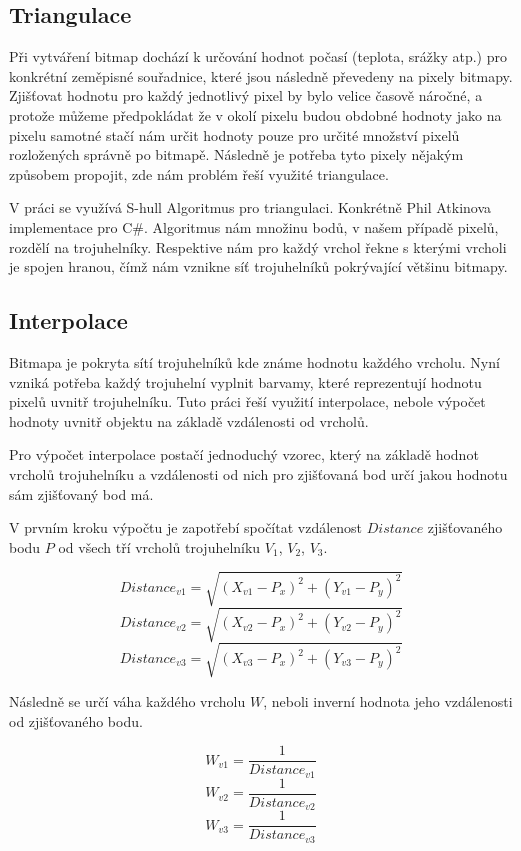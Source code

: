 \documentclass[czech,bachelor,dept460,male,csharp,cpdeclaration]{diploma}
\begin{document}
	\subsection{Triangulace}
	
	Při vytváření bitmap dochází k určování hodnot počasí (teplota, srážky atp.) pro konkrétní zeměpisné souřadnice, které jsou následně převedeny na pixely bitmapy. Zjišťovat hodnotu pro každý jednotlivý pixel by bylo velice časově náročné, a protože můžeme předpokládat že v okolí pixelu budou obdobné hodnoty jako na pixelu samotné stačí nám určit hodnoty pouze pro určité množství pixelů rozložených správně po bitmapě. Následně je potřeba tyto pixely nějakým způsobem propojit, zde nám problém řeší využité triangulace.
	
	V práci se využívá S-hull Algoritmus pro triangulaci. Konkrétně Phil Atkinova implementace pro C\#. Algoritmus nám množinu bodů, v našem případě pixelů, rozdělí na trojuhelníky. Respektive nám pro každý vrchol řekne s kterými vrcholi je spojen hranou, čímž nám vznikne síť trojuhelníků pokrývající většinu bitmapy.
	
	\subsection{Interpolace}
	
	Bitmapa je pokryta sítí trojuhelníků kde známe hodnotu každého vrcholu. Nyní vzniká potřeba každý trojuhelní vyplnit barvamy, které reprezentují hodnotu pixelů uvnitř trojuhelníku. Tuto práci řeší využití interpolace, nebole výpočet hodnoty uvnitř objektu na základě vzdálenosti od vrcholů.
	
	Pro výpočet interpolace postačí jednoduchý vzorec, který na základě hodnot vrcholů trojuhelníku a vzdálenosti od nich pro zjišťovaná bod určí jakou hodnotu sám zjišťovaný bod má.
	
	\vfill
	
	V prvním kroku výpočtu je zapotřebí spočítat vzdálenost $Distance$ zjišťovaného bodu $P$ od všech tří vrcholů trojuhelníku $V_1$, $V_2$, $V_3$. 
	
	\[Distance_{v1} =\sqrt{(X_{v1}-P_x)^2+(Y_{v1}-P_y)^2}\]
	\[Distance_{v2} =\sqrt{(X_{v2}-P_x)^2+(Y_{v2}-P_y)^2}\]
	\[Distance_{v3} =\sqrt{(X_{v3}-P_x)^2+(Y_{v3}-P_y)^2}\]
	
	Následně se určí váha každého vrcholu $W$, neboli inverní hodnota jeho vzdálenosti od zjišťovaného bodu.
	
	\[W_{v1} =\frac{1}{Distance_{v1}}\]
	\[W_{v2} =\frac{1}{Distance_{v2}}\]
	\[W_{v3} =\frac{1}{Distance_{v3}}\]
	
\end{document}
